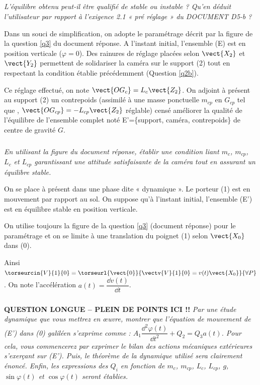 \documentclass[10pt,fleqn]{article} %
\begin{document}
\subparagraph{\label{q2c}}\textit{L’équilibre obtenu peut-il être qualifié de stable ou instable ? Qu’en déduit l’utilisateur par rapport à l’exigence 2.1  « pré réglage » du DOCUMENT D5-b ?}


Dans un souci de simplification, on adopte le paramétrage décrit par la figure de la question \ref{q3} du document réponse. A l'instant initial, l'ensemble (E) est en position verticale ($\varphi = 0$).
Des rainures de réglage placées selon $\vect{X_2}$ et $\vect{Y_2}$ permettent de solidariser la caméra sur le support (2) tout en respectant la condition établie précédemment (Question \ref{q2b}). 

Ce réglage effectué, on note $\vect{OG_c}=L_c\vect{Z_2}$. On adjoint à présent au support (2) un contrepoids 
(assimilé à une masse ponctuelle $m_{cp}$ en $G_{cp}$ tel que , $\vect{OG_{cp}}=-L_{cp}\vect{Z_2}$ réglable) 
censé améliorer la qualité de l’équilibre de l'ensemble complet noté E'=\{support, caméra, contrepoids\} de centre 
de gravité $G$.


\subparagraph{\label{q3}}\textit{En utilisant la figure du document réponse, établir une condition liant $m_c$, $m_{cp}$, $L_c$ et $L_{cp}$  garantissant une attitude satisfaisante de la caméra tout en assurant un équilibre stable.}

On se place à présent dans une phase dite « dynamique ». Le porteur (1) est en mouvement par rapport au sol. On suppose qu'à l'instant initial, l'ensemble (E') est en équilibre stable en position verticale.

On utilise toujours la figure de la question \ref{q3} (document réponse) pour le paramétrage et on se limite à une translation du poignet (1) selon $\vect{X_0}$ dans (0). 

Ainsi $\torseurcin{V}{1}{0}=\torseurl{\vect{0}}{\vectv{V}{1}{0}=v(t)\vect{X_0}}{\forall P}$.
On note l’accélération  $a(t)=\dfrac{\dd v(t)}{\dd t}$.


\subparagraph{ \label{q4}} \textbf{QUESTION LONGUE -- PLEIN DE POINTS ICI !!} \textit{Par une étude dynamique que vous mettrez en œuvre, montrer que l'équation de mouvement de (E') dans (0) galiléen s'exprime comme : $A_1 \dfrac{\dd^2 \varphi(t)}{\dd t^2}+Q_2 = Q_3 a(t)$.
 Pour cela, vous commencerez par exprimer le bilan des actions mécaniques extérieures s’exerçant sur (E’). Puis, le théorème de la dynamique utilisé sera clairement énoncé. Enfin, les expressions des $Q_i$ en fonction de  $m_c$, $m_{cp}$, $L_c$, $L_{cp}$, $g$, $\sin\varphi(t)$ et $\cos\varphi(t)$ seront établies.}
\end{document}
